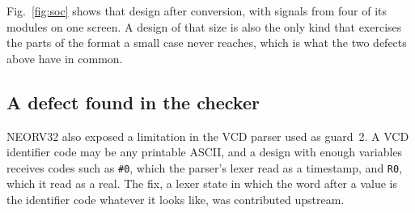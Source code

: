 Fig.~\ref{fig:soc} shows that design after conversion, with signals
from four of its modules on one screen. A design of that size is also
the only kind that exercises the parts of the format a small case
never reaches, which is what the two defects above have in common.

\subsection{A defect found in the checker}

NEORV32 also exposed a limitation in the VCD parser used as guard~2. A
VCD identifier code may be any printable ASCII, and a design with
enough variables receives codes such as \texttt{\#0}, which the
parser's lexer read as a timestamp, and \texttt{R0}, which it read as
a real. The fix, a lexer state in which the word after a value is the
identifier code whatever it looks like, was contributed upstream.
